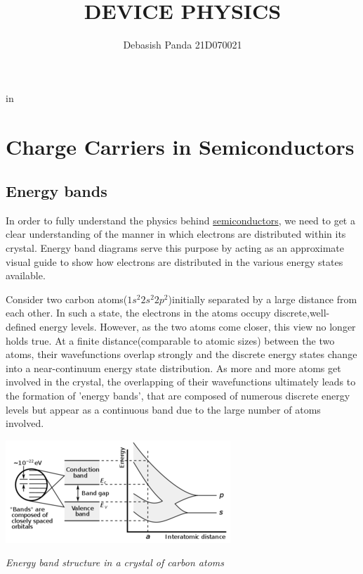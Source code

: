 \documentclass[12 pt]{article}
\title{\textbf{\huge DEVICE PHYSICS}}
\author{Debasish Panda 21D070021}
\date{\parbox{\linewidth}{\centering%
  \today\endgraf\bigskip
  Mentor - Jay Sonawane \endgraf \bigskip
  \textbf{Department of Electrical Engineering}\endgraf
  \textbf{Indian Institute of Technology, Bombay}}}
\begin{document}


\begin{titlepage}
\maketitle
\end{titlepage}

\tableofcontents
{} in
\newpage
\section{Charge Carriers in Semiconductors}

\subsection{Energy bands}
In order to fully understand the physics behind \href{https://en.wikipedia.org/wiki/Semiconductor}{semiconductors}, we need to get a clear understanding of the manner in which electrons are distributed within its crystal. Energy band diagrams serve this purpose by acting as an approximate visual guide to show how electrons are distributed in the various energy states available.  \par
Consider two carbon atoms($1s^{2}2s^{2}2p^{2}$)initially separated by a large distance from each other. In such a state, the electrons in the atoms occupy discrete,well-defined energy levels. However, as the two atoms come closer, this view no longer holds true. At a finite distance(comparable to atomic sizes) between the two atoms, their wavefunctions overlap strongly and the discrete energy states change into a near-continuum energy state distribution. As more and more atoms get involved in the crystal, the overlapping of their wavefunctions ultimately leads to the formation of 'energy bands', that are composed of numerous discrete energy levels but appear as a continuous band due to the large number of atoms involved.\newline

\par
 \begin{center}
    \includegraphics{energy_band_structure_1_50.png}
    \end{center}
    \begin{center}
      \emph{\hspace{0.6cm}Energy band structure in a crystal of carbon atoms}
  \end{center}
  
\end{document}

